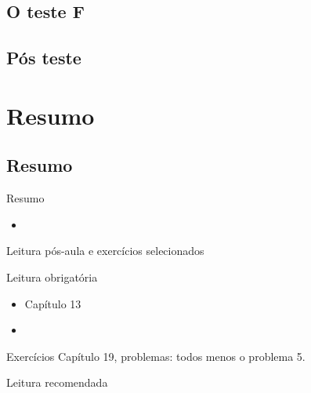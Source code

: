 \documentclass{beamer}
\begin{document}




\subsection{O teste F}

\subsection{Pós teste}

\section{Resumo}

\subsection{Resumo}

\begin{frame}{Resumo}
  \begin{itemize}
  \item
  \end{itemize}
\end{frame}

\begin{frame}{Leitura pós-aula e exercícios selecionados}
  \begin{block}{Leitura obrigatória}
    \begin{itemize}
    \item Capítulo 13
    \item 
    \end{itemize}
  \end{block}
  \begin{block}{Exercícios}
    Capítulo 19, problemas: todos menos o problema 5.
  \end{block}
  \begin{block}{Leitura recomendada}
  \end{block}
\end{frame}
\end{document}
